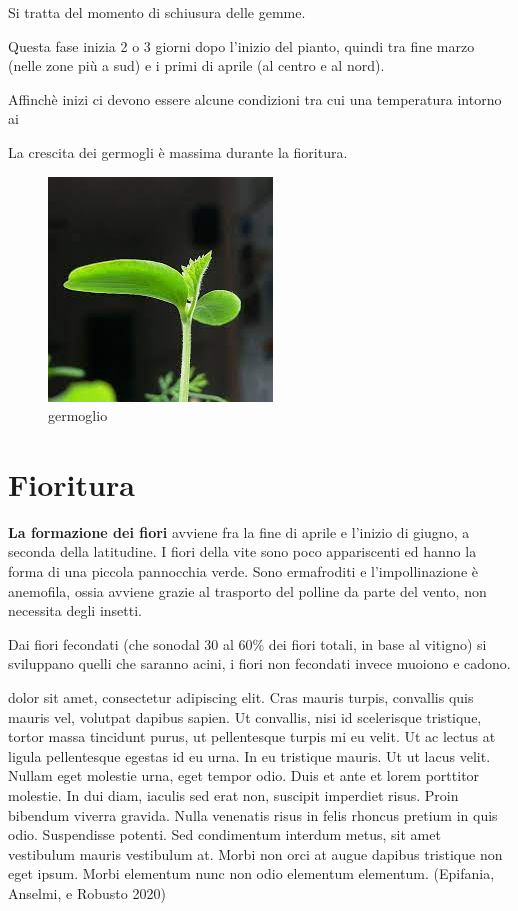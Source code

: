 \documentclass[
]{article}
\begin{document}
Si tratta del momento di schiusura delle gemme.

Questa fase inizia 2 o 3 giorni dopo l'inizio del pianto, quindi tra
fine marzo (nelle zone più a sud) e i primi di aprile (al centro e al
nord).

Affinchè inizi ci devono essere alcune condizioni tra cui una
temperatura intorno ai \color{red}{7-12°C.} \normalcolor

La crescita dei germogli è massima durante la fioritura.

\begin{figure}
\centering
\includegraphics{immagini/germ.jpeg}
\caption{germoglio}
\end{figure}

\hypertarget{fioritura}{%
\section{Fioritura}\label{fioritura}}

\textbf{La formazione dei fiori} avviene fra la fine di aprile e
l'inizio di giugno, a seconda della
latitudine.\color{green}{Lorem ipsum} \normalcolor I fiori della vite
sono poco appariscenti ed hanno la forma di una piccola pannocchia
verde. Sono ermafroditi e l'impollinazione è anemofila, ossia avviene
grazie al trasporto del polline da parte del vento, non necessita degli
insetti.

Dai fiori fecondati (che sonodal 30 al 60\% dei fiori totali, in base al
vitigno) si sviluppano quelli che saranno acini, i fiori non fecondati
invece muoiono e cadono.

dolor sit amet, consectetur adipiscing elit. Cras mauris turpis,
convallis quis mauris vel, volutpat dapibus sapien. Ut convallis, nisi
id scelerisque tristique, tortor massa tincidunt purus, ut pellentesque
turpis mi eu velit. Ut ac lectus at ligula pellentesque egestas id eu
urna. In eu tristique mauris. Ut ut lacus velit. Nullam eget molestie
urna, eget tempor odio. Duis et ante et lorem porttitor molestie. In dui
diam, iaculis sed erat non, suscipit imperdiet risus. Proin bibendum
viverra gravida. Nulla venenatis risus in felis rhoncus pretium in quis
odio. Suspendisse potenti. Sed condimentum interdum metus, sit amet
vestibulum mauris vestibulum at. Morbi non orci at augue dapibus
tristique non eget ipsum. Morbi elementum nunc non odio elementum
elementum. (Epifania, Anselmi, e Robusto 2020)
\end{document}
